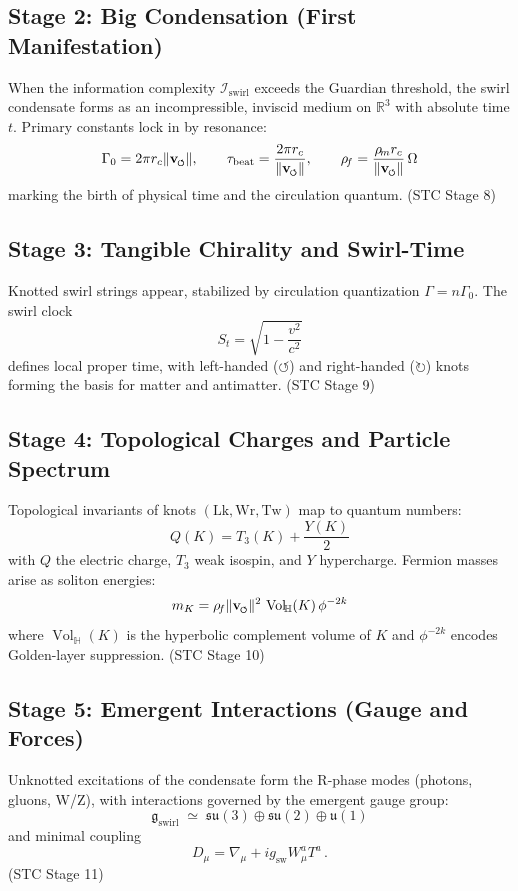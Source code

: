 \documentclass[10pt,reprint,aps,onecolumn,nofootinbib]{revtex4-2}
\newcommand{\vnorm}{\lVert \mathbf{v}_{\mkern-2mu\scriptscriptstyle\boldsymbol{\circlearrowleft}} \rVert}               %
\newcommand{\Vol}{\operatorname{Vol}}   %
\begin{document}
        \subsection*{Stage 2: Big Condensation (First Manifestation)}
            When the information complexity $\mathcal{I}_{\mathrm{swirl}}$ exceeds the Guardian threshold,
            the swirl condensate forms as an incompressible, inviscid medium on $\mathbb{R}^3$ with absolute time $t$.
            Primary constants lock in by resonance:
            \[
                \Gamma_0 = 2\pi r_c \vnorm,
                \qquad
                \tau_{\mathrm{beat}} = \frac{2\pi r_c}{\vnorm},
                \qquad
                \rho_{\!f} = \frac{\rho_{\!m} r_c}{\vnorm}\,\Omega
            \]
            marking the birth of physical time and the circulation quantum.
            \hfill (STC Stage 8)

        \subsection*{Stage 3: Tangible Chirality and Swirl-Time}
            Knotted swirl strings appear, stabilized by circulation quantization $\Gamma = n\Gamma_0$.
            The swirl clock
            \[
                S_t = \sqrt{1 - \frac{v^{2}}{c^{2}}}
            \]
            defines local proper time, with left-handed ($\circlearrowleft$) and right-handed ($\circlearrowright$) knots forming the basis for matter and antimatter.
            \hfill (STC Stage 9)

        \subsection*{Stage 4: Topological Charges and Particle Spectrum}
            Topological invariants of knots $(\mathrm{Lk}, \mathrm{Wr}, \mathrm{Tw})$ map to quantum numbers:
            \[
                Q(K) = T_3(K) + \frac{Y(K)}{2}
            \]
            with $Q$ the electric charge, $T_3$ weak isospin, and $Y$ hypercharge.
            Fermion masses arise as soliton energies:
            \[
                m_{K} = \rho_{\!f} \vnorm^{2}\, \Vol_{\!\mathbb{H}}(K)\,\phi^{-2k}
            \]
            where $\Vol_{\!\mathbb{H}}(K)$ is the hyperbolic complement volume of $K$
            and $\phi^{-2k}$ encodes Golden-layer suppression.
            \hfill (STC Stage 10)

        \subsection*{Stage 5: Emergent Interactions (Gauge and Forces)}
            Unknotted excitations of the condensate form the R-phase modes (photons, gluons, W/Z),
            with interactions governed by the emergent gauge group:
            \[
                \mathfrak{g}_{\mathrm{swirl}} \;\simeq\;
                \mathfrak{su}(3) \oplus \mathfrak{su}(2) \oplus \mathfrak{u}(1)
            \]
            and minimal coupling
            \[
                D_\mu = \nabla_\mu + i g_{\mathrm{sw}} W_{\mu}^{a}T^{a}\,.
            \]
            \hfill (STC Stage 11)
\end{document}
